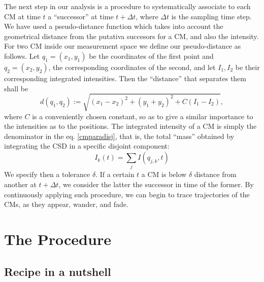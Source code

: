 \documentclass{article}
\begin{document}
The next step in our analysis is a procedure to systematically associate to each CM at time $t$ a ``successor'' at time $t+\Delta t$, where $\Delta t$ is the sampling time step. We have used a pseudo-distance function which takes into account the geometrical distance from the putativa succesors for a CM, and also the intensity. For two CM inside our measurement space we define our pseudo-distance as follows. Let $q_1=(x_1, y_1)$ be the coordinates of the first point and $q_2=(x_2,y_2)$, the corresponding coordinates of the second, and let $I_1, I_2$ be their corresponding integrated intensities. Then the ``distance'' that separates them shall be 
\begin{equation}\label{pseudodist}
d(q_1,q_2):=\sqrt{(x_1-x_2)^2+(y_1+y_2)^2+C(I_1-I_2)},
\end{equation}
where $C$ is a conveniently chosen constant, so as to give a similar importance to the intensities as to the positions.
The integrated intensity of a CM is simply the denominator in the eq. \ref{cmparadisj}, that is, the total ``mass'' obtained by integrating the CSD in a specific disjoint component:
\begin{equation}
I_k(t)=\sum_j I (q_{j,k}, t)
\end{equation}
We specify then a tolerance $\delta$. If a certain $t$ a CM is below $\delta$ distance from another at $t+\Delta t$, we consider the latter the successor in time of the former. By continuously applying such procedure, we can begin to trace trajectories of the CMs, as they appear, wander, and fade. 

 
 \section{The Procedure}
\subsection{Recipe in a nutshell}
 
\end{document}
